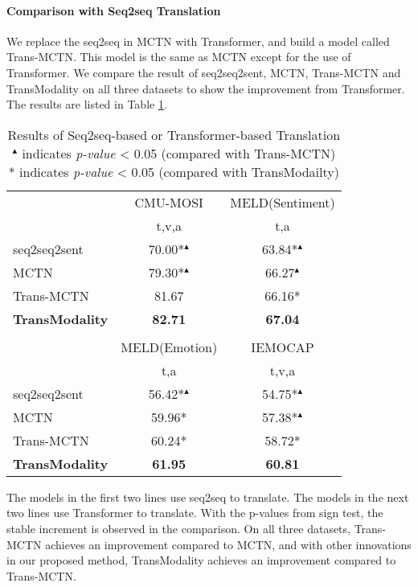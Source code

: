 \documentclass[sigconf]{acmart}
\begin{document}
	\paragraph{Comparison with Seq2seq Translation}
	We replace the seq2seq in MCTN \cite{pham2018found} with Transformer, and build a model called Trans-MCTN. This model is the same as MCTN except for the use of Transformer. We compare the result of seq2seq2sent, MCTN, Trans-MCTN and TransModality on all three datasets to show the improvement from Transformer. The results are listed in Table \ref{tab:head2head}.
	\begin{table}[htbp]
		\centering
		\caption{Results of Seq2seq-based or Transformer-based Translation \\ $^{\blacktriangle}$ indicates \textit{p-value} < 0.05 (compared with Trans-MCTN) \\ * indicates \textit{p-value} < 0.05 (compared with TransModailty)}
		\begin{tabular}{|l|c|c|}
		\hline
		\multirow{2}[4]{*}{} & CMU-MOSI & MELD(Sentiment) \\
	\cline{2-3}          & t,v,a & t,a \\
		\hline
		\hline
		seq2seq2sent & 70.00*$^{\blacktriangle}$ & 63.84*$^{\blacktriangle}$ \\
		MCTN  & 79.30*$^{\blacktriangle}$ & 66.27$^{\blacktriangle}$ \\
		\hline
		Trans-MCTN & 81.67 & 66.16* \\
		\hline
		\textbf{TransModality} & \textbf{82.71} & \textbf{67.04} \\
		\hline
		\multicolumn{1}{l}{} & \multicolumn{1}{c}{} & \multicolumn{1}{c}{} \\
		\hline
		\multirow{2}[4]{*}{} & MELD(Emotion) & IEMOCAP \\
	\cline{2-3}          & t,a   & t,v,a \\
		\hline
		\hline
		seq2seq2sent & 56.42*$^{\blacktriangle}$ & 54.75*$^{\blacktriangle}$ \\
		MCTN  & 59.96* & 57.38*$^{\blacktriangle}$ \\
		\hline
		Trans-MCTN & 60.24* & 58.72* \\
		\hline
		\textbf{TransModality} & \textbf{61.95} & \textbf{60.81} \\
		\hline
		\end{tabular}\label{tab:head2head}\end{table}The models in the first two lines use seq2seq to translate. The models in the next two lines use Transformer to translate. With the p-values from sign test, the stable increment is observed in the comparison. On all three datasets, Trans-MCTN achieves an improvement compared to MCTN, and with other innovations in our proposed method, TransModality achieves an improvement compared to Trans-MCTN. 
	
\end{document}
